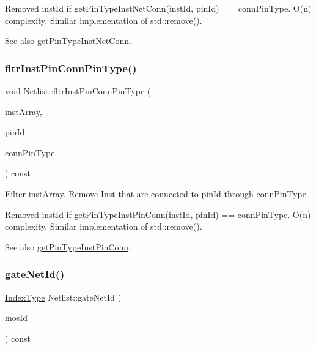 Removed inst\+Id if get\+Pin\+Type\+Inst\+Net\+Conn(inst\+Id, pin\+Id) == conn\+Pin\+Type. O(n) complexity. Similar implementation of std\+::remove().

\begin{DoxySeeAlso}{See also}
\hyperlink{classNetlist_a6bc6f9666ed8c833b967c38f2e164a1e}{get\+Pin\+Type\+Inst\+Net\+Conn}. 
\end{DoxySeeAlso}
\mbox{\label{classNetlist_a1df5b1bb963671f65331c287d4d56b2d}} 
\subsubsection{\texorpdfstring{fltr\+Inst\+Pin\+Conn\+Pin\+Type()}{fltrInstPinConnPinType()}}
{\footnotesize\ttfamily void Netlist\+::fltr\+Inst\+Pin\+Conn\+Pin\+Type (\begin{DoxyParamCaption}\item[{std\+::vector$<$ \hyperlink{type_8h_a581e8093e28e7362f2b6937296190676}{Index\+Type} $>$ \&}]{inst\+Array,  }\item[{\hyperlink{type_8h_a581e8093e28e7362f2b6937296190676}{Index\+Type}}]{pin\+Id,  }\item[{\hyperlink{type_8h_afaab50027002ecbb6c8ac27e727d1bb4}{Pin\+Type}}]{conn\+Pin\+Type }\end{DoxyParamCaption}) const}



Filter inst\+Array. Remove \hyperlink{classInst}{Inst} that are connected to pin\+Id through conn\+Pin\+Type. 

Removed inst\+Id if get\+Pin\+Type\+Inst\+Pin\+Conn(inst\+Id, pin\+Id) == conn\+Pin\+Type. O(n) complexity. Similar implementation of std\+::remove().

\begin{DoxySeeAlso}{See also}
\hyperlink{classNetlist_a27d477f7bd6fffd915015dbd3b3a0649}{get\+Pin\+Type\+Inst\+Pin\+Conn}. 
\end{DoxySeeAlso}
\mbox{\label{classNetlist_a6c248fed42772e11d054d8dccb720005}} 
\subsubsection{\texorpdfstring{gate\+Net\+Id()}{gateNetId()}}
{\footnotesize\ttfamily \hyperlink{type_8h_a581e8093e28e7362f2b6937296190676}{Index\+Type} Netlist\+::gate\+Net\+Id (\begin{DoxyParamCaption}\item[{\hyperlink{type_8h_a581e8093e28e7362f2b6937296190676}{Index\+Type}}]{mos\+Id }\end{DoxyParamCaption}) const\hspace{0.3cm}{\ttfamily [inline]}}



